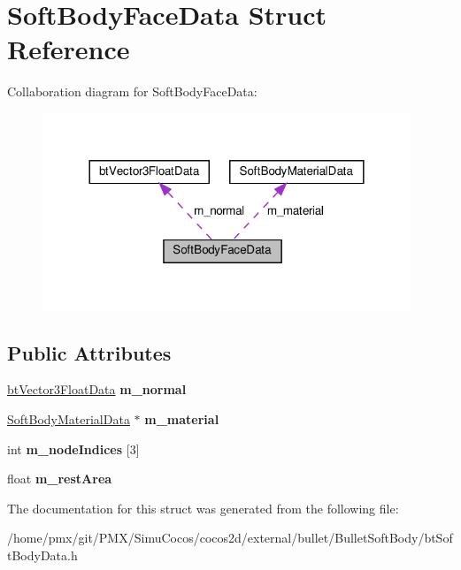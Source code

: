 \hypertarget{structSoftBodyFaceData}{}\section{Soft\+Body\+Face\+Data Struct Reference}
\label{structSoftBodyFaceData}


Collaboration diagram for Soft\+Body\+Face\+Data\+:
\nopagebreak
\begin{figure}[H]
\begin{center}
\leavevmode
\includegraphics[width=312pt]{structSoftBodyFaceData__coll__graph}
\end{center}
\end{figure}
\subsection*{Public Attributes}
\begin{DoxyCompactItemize}
\item 
\mbox{\label{structSoftBodyFaceData_a0571d9b6ae94d31ed8687c3ba9bb5225}} 
\hyperlink{structbtVector3FloatData}{bt\+Vector3\+Float\+Data} {\bfseries m\+\_\+normal}
\item 
\mbox{\label{structSoftBodyFaceData_a6e9f3df3ab6ff0e79464b4ac49702db0}} 
\hyperlink{structSoftBodyMaterialData}{Soft\+Body\+Material\+Data} $\ast$ {\bfseries m\+\_\+material}
\item 
\mbox{\label{structSoftBodyFaceData_aa3c85d456d0ff5ff8184788765c5f937}} 
int {\bfseries m\+\_\+node\+Indices} \mbox{[}3\mbox{]}
\item 
\mbox{\label{structSoftBodyFaceData_af1735e28f48b38fe1df6a27b9ac44c90}} 
float {\bfseries m\+\_\+rest\+Area}
\end{DoxyCompactItemize}


The documentation for this struct was generated from the following file\+:\begin{DoxyCompactItemize}
\item 
/home/pmx/git/\+P\+M\+X/\+Simu\+Cocos/cocos2d/external/bullet/\+Bullet\+Soft\+Body/bt\+Soft\+Body\+Data.\+h\end{DoxyCompactItemize}
